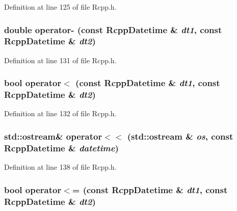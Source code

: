 Definition at line 125 of file Rcpp.h.\hypertarget{classRcppDatetime_946df17f9ce3c423518d0db74e2bbbc4}{
\subsubsection[{operator-}]{\setlength{\rightskip}{0pt plus 5cm}double operator- (const {\bf RcppDatetime} \& {\em dt1}, \/  const {\bf RcppDatetime} \& {\em dt2})}}
\label{classRcppDatetime_946df17f9ce3c423518d0db74e2bbbc4}




Definition at line 131 of file Rcpp.h.\hypertarget{classRcppDatetime_142f9346629bf7a6f673ba05d9338cf3}{
\subsubsection[{operator$<$}]{\setlength{\rightskip}{0pt plus 5cm}bool operator$<$ (const {\bf RcppDatetime} \& {\em dt1}, \/  const {\bf RcppDatetime} \& {\em dt2})}}
\label{classRcppDatetime_142f9346629bf7a6f673ba05d9338cf3}




Definition at line 132 of file Rcpp.h.\hypertarget{classRcppDatetime_778b21a52b7f2b17978933c3ec27754e}{
\subsubsection[{operator$<$$<$}]{\setlength{\rightskip}{0pt plus 5cm}std::ostream\& operator$<$$<$ (std::ostream \& {\em os}, \/  const {\bf RcppDatetime} \& {\em datetime})}}
\label{classRcppDatetime_778b21a52b7f2b17978933c3ec27754e}




Definition at line 138 of file Rcpp.h.\hypertarget{classRcppDatetime_7d98733f95f5647ac10bb8236c1a7a8d}{
\subsubsection[{operator$<$=}]{\setlength{\rightskip}{0pt plus 5cm}bool operator$<$= (const {\bf RcppDatetime} \& {\em dt1}, \/  const {\bf RcppDatetime} \& {\em dt2})}}
\label{classRcppDatetime_7d98733f95f5647ac10bb8236c1a7a8d}




